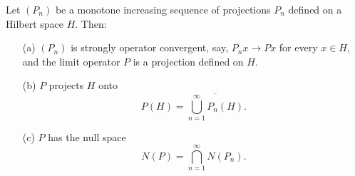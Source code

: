\begin{theorem}
    Let \( ({P}_{n}) \) be a monotone increasing sequence of projections \( {P}_{n} \) defined on a Hilbert space \( H  \). Then:
    \begin{enumerate}
        \item[(a)] \( ({P}_{n}) \) is strongly operator convergent, say, \( {P}_{n}x \to Px   \) for every \( x \in H  \), and the limit operator \( P  \) is a projection defined on \( H  \).
        \item[(b)] \( P \) projects \(H  \) onto 
            \[  P(H) = \overline{\bigcup_{ n=1  }^{ \infty  }  {P}_{n}(H) }. \]
        \item[(c)] \( P  \) has the null space 
            \[  N(P) = \bigcap_{ n=1  }^{ \infty  }  N({P}_{n}). \]
    \end{enumerate}
\end{theorem}
